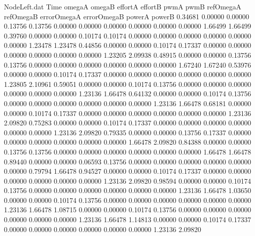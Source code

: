 \begin{filecontents}{NodeLeft.dat}
Time omegaA omegaB effortA effortB pwmA pwmB refOmegaA refOmegaB errorOmegaA errorOmegaB powerA powerB
   0.34681    0.00000    0.00000     0.13756    0.13756    0.00000    0.00000    0.00000    0.00000    0.00000    0.00000    1.66499    1.66499
   0.39760    0.00000    0.00000     0.10174    0.10174    0.00000    0.00000    0.00000    0.00000    0.00000    0.00000    1.23478    1.23478
   0.44856    0.00000    0.00000     0.10174    0.17337    0.00000    0.00000    0.00000    0.00000    0.00000    0.00000    1.23205    2.09938
   0.48915    0.00000    0.00000     0.13756    0.13756    0.00000    0.00000    0.00000    0.00000    0.00000    0.00000    1.67240    1.67240
   0.53976    0.00000    0.00000     0.10174    0.17337    0.00000    0.00000    0.00000    0.00000    0.00000    0.00000    1.23805    2.10961
   0.59051    0.00000    0.00000     0.10174    0.13756    0.00000    0.00000    0.00000    0.00000    0.00000    0.00000    1.23136    1.66478
   0.64132    0.00000    0.00000     0.10174    0.13756    0.00000    0.00000    0.00000    0.00000    0.00000    0.00000    1.23136    1.66478
   0.68181    0.00000    0.00000     0.10174    0.17337    0.00000    0.00000    0.00000    0.00000    0.00000    0.00000    1.23136    2.09820
   0.75283    0.00000    0.00000     0.10174    0.17337    0.00000    0.00000    0.00000    0.00000    0.00000    0.00000    1.23136    2.09820
   0.79335    0.00000    0.00000     0.13756    0.17337    0.00000    0.00000    0.00000    0.00000    0.00000    0.00000    1.66478    2.09820
   0.84388    0.00000    0.00000     0.13756    0.13756    0.00000    0.00000    0.00000    0.00000    0.00000    0.00000    1.66478    1.66478
   0.89440    0.00000    0.00000     0.06593    0.13756    0.00000    0.00000    0.00000    0.00000    0.00000    0.00000    0.79794    1.66478
   0.94527    0.00000    0.00000     0.10174    0.17337    0.00000    0.00000    0.00000    0.00000    0.00000    0.00000    1.23136    2.09820
   0.98594    0.00000    0.00000     0.10174    0.13756    0.00000    0.00000    0.00000    0.00000    0.00000    0.00000    1.23136    1.66478
   1.03650    0.00000    0.00000     0.10174    0.13756    0.00000    0.00000    0.00000    0.00000    0.00000    0.00000    1.23136    1.66478
   1.08715    0.00000    0.00000     0.10174    0.13756    0.00000    0.00000    0.00000    0.00000    0.00000    0.00000    1.23136    1.66478
   1.14813    0.00000    0.00000     0.10174    0.17337    0.00000    0.00000    0.00000    0.00000    0.00000    0.00000    1.23136    2.09820

\end{filecontents}
